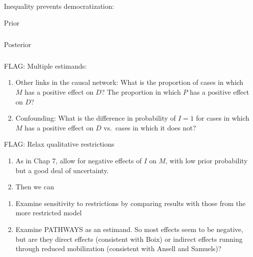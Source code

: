\documentclass[
  12pt,
]{book}
\begin{document}
Inequality prevents democratization:

\begin{table}

\caption{\label{tab:IpreventsDem}Prior}
\centering
\begin{tabular}[t]{}
\hline

\hline
\end{tabular}
\end{table}

\begin{table}

\caption{\label{tab:IpreventsDem}Posterior}
\centering
\begin{tabular}[t]{}
\hline

\hline
\end{tabular}
\end{table}

FLAG: Multiple estimands:

\begin{enumerate}
\def\labelenumi{\arabic{enumi}.}
\item
  Other links in the causal network: What is the proportion of cases in which \(M\) has a positive effect on \(D\)? The proportion in which \(P\) has a positive effect on \(D\)?
\item
  Confounding: What is the difference in probability of \(I=1\) for cases in which \(M\) has a positive effect on \(D\) vs.~cases in which it does not?
\end{enumerate}

FLAG: Relax qualitative restrictions

\begin{enumerate}
\def\labelenumi{\arabic{enumi}.}
\item
  As in Chap 7, allow for negative effects of \(I\) on \(M\), with low prior probability but a good deal of uncertainty.
\item
  Then we can
\end{enumerate}

\begin{enumerate}
\def\labelenumi{(\alph{enumi})}
\item
  Examine sensitivity to restrictions by comparing results with those from the more restricted model
\item
  Examine PATHWAYS as an estimand. So most effects seem to be negative, but are they direct effects (consistent with Boix) or indirect effects running through reduced mobilization (consistent with Ansell and Samuels)?
\end{enumerate}
\end{document}
